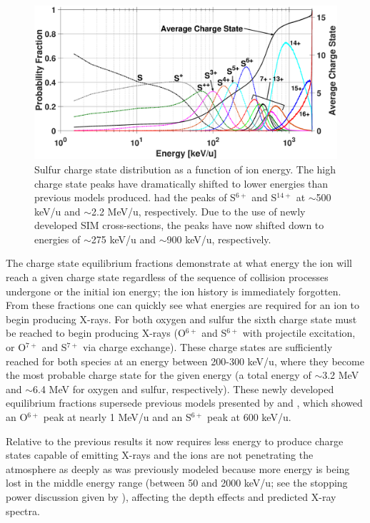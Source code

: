 \documentclass[draft]{agujournal2018}
\begin{document}
\begin{figure}
    \centering
    \includegraphics[width=\textwidth]{Figures/CSDsul.eps}
    \caption{Sulfur charge state distribution as a function of ion energy. The high charge state peaks have dramatically shifted to lower energies than previous models produced. \citet{ozak2010} had the peaks of S$^{6+}$ and S$^{14+}$ at $\sim$500 keV/u and $\sim$2.2 MeV/u, respectively. Due to the use of newly developed SIM cross-sections, the peaks have now shifted down to energies of $\sim$275 keV/u and $\sim$900 keV/u, respectively.}
    \label{fig:CSDsul}
\end{figure}

The charge state equilibrium fractions demonstrate at what energy the ion will reach a given charge state regardless of the sequence of collision processes undergone or the initial ion energy; the ion history is immediately forgotten.
From these fractions one can quickly see what energies are required for an ion to begin producing X-rays.
For both oxygen and sulfur the sixth charge state must be reached to begin producing X-rays (O$^{6+}$ and S$^{6+}$ with projectile excitation, or O$^{7+}$ and S$^{7+}$ via charge exchange).
These charge states are sufficiently reached for both species at an energy between 200-300 keV/u, where they become the most probable charge state for the given energy (a total energy of $\sim$3.2 MeV and $\sim$6.4 MeV for oxygen and sulfur, respectively).
These newly developed equilibrium fractions supersede previous models presented by \citet{ozak2010} and \citet{houston2018}, which showed an O$^{6+}$ peak at nearly 1 MeV/u and an S$^{6+}$ peak at 600 keV/u.

Relative to the previous results it now requires less energy to produce charge states capable of emitting X-rays and the ions are not penetrating the atmosphere as deeply as was previously modeled because more energy is being lost in the middle energy range (between 50 and 2000 keV/u; see the stopping power discussion given by \citet{schultz2019}), affecting the depth effects and predicted X-ray spectra.
\end{document}
